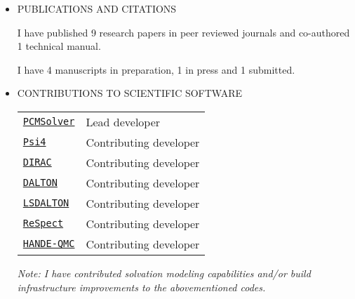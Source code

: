 \documentclass[notitlepage,a4paper,11pt]{article}
\newcommand{\pcmsolver}{\href{http://pcmsolver.readthedocs.org}{\texttt{PCMSolver}}}
\newcommand{\psicode}{\href{http://www.psicode.org}{\texttt{Psi4}}}
\newcommand{\DIRAC}{\href{http://www.diracprogram.org}{\texttt{DIRAC}}}
\newcommand{\DALTON}{\href{http://www.daltonprogram.org}{\texttt{DALTON}}}
\newcommand{\LSDALTON}{\href{http://www.daltonprogram.org}{\texttt{LSDALTON}}}
\newcommand{\ReSpect}{\href{http://respectprogram.org/}{\texttt{ReSpect}}}
\newcommand{\HANDE}{\href{http://hande.readthedocs.io/}{\texttt{HANDE-QMC}}}
\begin{document}
\begin{itemize}

\item PUBLICATIONS AND CITATIONS

I have published 9 research papers in peer reviewed journals and co-authored 1
technical manual.
\begin{refsection}
\nocite{*}
\printbibliography[heading=none]
\end{refsection}

I have 4 manuscripts in preparation, 1 in press and 1 submitted.
\begin{refsection}
\nocite{*}
\printbibliography[heading=none]
\end{refsection}

\item CONTRIBUTIONS TO SCIENTIFIC SOFTWARE

  \begin{tabular}{ll}
 \pcmsolver{} & Lead developer \\
 \psicode{}   & Contributing developer \\
 \DIRAC{}     & Contributing developer \\
 \DALTON{}    & Contributing developer \\
 \LSDALTON{}  & Contributing developer \\
 \ReSpect{}   & Contributing developer \\
 \HANDE{}     & Contributing developer \\
  \end{tabular}

\emph{ Note: I have contributed solvation modeling capabilities and/or build
infrastructure improvements to the abovementioned codes.}

\end{itemize}
\end{document}

